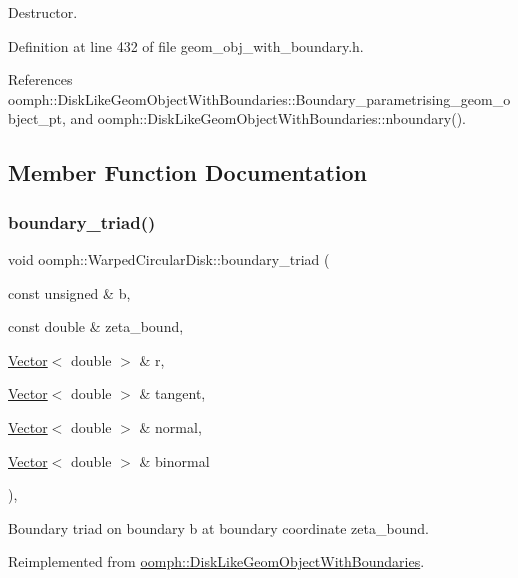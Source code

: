 Destructor. 



Definition at line 432 of file geom\+\_\+obj\+\_\+with\+\_\+boundary.\+h.



References oomph\+::\+Disk\+Like\+Geom\+Object\+With\+Boundaries\+::\+Boundary\+\_\+parametrising\+\_\+geom\+\_\+object\+\_\+pt, and oomph\+::\+Disk\+Like\+Geom\+Object\+With\+Boundaries\+::nboundary().



\subsection{Member Function Documentation}
\mbox{\label{classoomph_1_1WarpedCircularDisk_aa24472806fff65e4950d71dd9536965f}} 
\subsubsection{\texorpdfstring{boundary\+\_\+triad()}{boundary\_triad()}}
{\footnotesize\ttfamily void oomph\+::\+Warped\+Circular\+Disk\+::boundary\+\_\+triad (\begin{DoxyParamCaption}\item[{const unsigned \&}]{b,  }\item[{const double \&}]{zeta\+\_\+bound,  }\item[{\hyperlink{classoomph_1_1Vector}{Vector}$<$ double $>$ \&}]{r,  }\item[{\hyperlink{classoomph_1_1Vector}{Vector}$<$ double $>$ \&}]{tangent,  }\item[{\hyperlink{classoomph_1_1Vector}{Vector}$<$ double $>$ \&}]{normal,  }\item[{\hyperlink{classoomph_1_1Vector}{Vector}$<$ double $>$ \&}]{binormal }\end{DoxyParamCaption})\hspace{0.3cm}{\ttfamily [inline]}, {\ttfamily [virtual]}}



Boundary triad on boundary b at boundary coordinate zeta\+\_\+bound. 



Reimplemented from \hyperlink{classoomph_1_1DiskLikeGeomObjectWithBoundaries_aafe14f8fb055a10b33da4e730f457308}{oomph\+::\+Disk\+Like\+Geom\+Object\+With\+Boundaries}.



